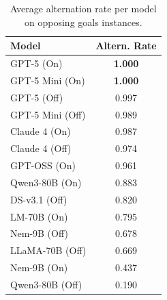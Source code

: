 \documentclass[../main.tex]{subfiles}
\begin{document}
\begin{table}[ht]
\centering
\footnotesize
\setlength{\tabcolsep}{4pt}
\begin{tabular}{l c}
\hline
\textbf{Model} & \textbf{Altern. Rate} \\
\hline
GPT-5 (On) & \textbf{1.000} \\
GPT-5 Mini (On) & \textbf{1.000} \\
GPT-5 (Off) & 0.997 \\
GPT-5 Mini (Off) & 0.989 \\
Claude 4 (On) & 0.987 \\
Claude 4 (Off) & 0.974 \\
GPT-OSS (On) & 0.961 \\
Qwen3-80B (On) & 0.883 \\
DS-v3.1 (Off) & 0.820 \\
LM-70B (On) & 0.795 \\
Nem-9B (Off) & 0.678 \\
LLaMA-70B (Off) & 0.669 \\
Nem-9B (On) & 0.437 \\
Qwen3-80B (Off) & 0.190 \\
\hline
\end{tabular}
\caption{Average alternation rate per model on opposing goals instances.}
\label{tab:air-balloon-alternation}
\end{table}

\end{document}
